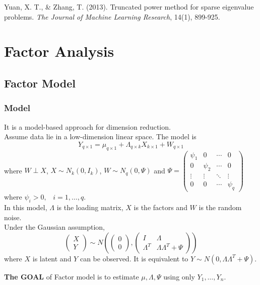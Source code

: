 \documentclass[12pt]{book}
\theoremstyle{definition}
\theoremstyle{remark}
\begin{document}
\begin{referencebox}
    Yuan, X. T., \& Zhang, T. (2013). Truncated power method for sparse eigenvalue problems. \textit{The Journal of Machine Learning Research}, 14(1), 899-925.
\end{referencebox}

\newpage
\chapter{Factor Analysis}
\section{Factor Model}
\subsection{Model}
It is a model-based approach for dimension reduction. \\
Assume data lie in a low-dimension linear space. The model is \[Y_{q\times 1} = \mu_{q\times 1} + \Lambda_{q\times k} X_{k\times 1}+ W_{q \times 1}\]
where $W\perp X$, $X\sim N_k(0, I_k)$, $W\sim N_q(0,\Psi)$ and $\Psi = \begin{pmatrix}  
  \psi_1 & 0 & \cdots & 0 \\  
  0 & \psi_2 & \cdots & 0 \\  
  \vdots & \vdots & \ddots & \vdots \\  
  0 & 0 & \cdots & \psi_q  
\end{pmatrix} $ where $\psi_i>0,\;\;\;i = 1,\dots,q$.\\
In this model, $\Lambda$ is the loading matrix, $X$ is the factors and $W$ is the random noise.\\

Under the Gaussian assumption, 
\[\begin{pmatrix}
 X\\
Y
\end{pmatrix}\sim N(\begin{pmatrix}
 0\\
0
\end{pmatrix}, \begin{pmatrix}
 I & \Lambda\\
 \Lambda^T &\Lambda\Lambda^T+\Psi\end{pmatrix})\]
where $X$ is latent and $Y$ can be observed. It is equivalent to $Y\sim N(0,\Lambda\Lambda^T+\Psi)$.

\textbf{The GOAL} of Factor model is to estimate $\mu, \Lambda, \Psi$ using only $Y_1, \dots, Y_n$.
\end{document}
